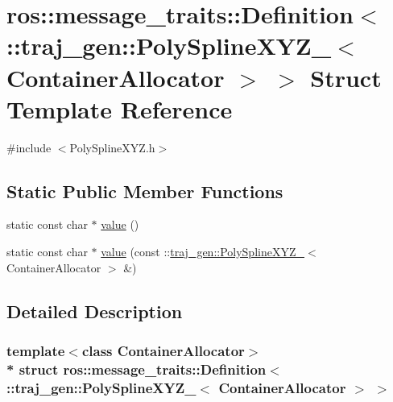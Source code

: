\hypertarget{structros_1_1message__traits_1_1_definition_3_01_1_1traj__gen_1_1_poly_spline_x_y_z___3_01_container_allocator_01_4_01_4}{}\section{ros\+:\+:message\+\_\+traits\+:\+:Definition$<$ \+:\+:traj\+\_\+gen\+:\+:Poly\+Spline\+X\+Y\+Z\+\_\+$<$ Container\+Allocator $>$ $>$ Struct Template Reference}
\label{structros_1_1message__traits_1_1_definition_3_01_1_1traj__gen_1_1_poly_spline_x_y_z___3_01_container_allocator_01_4_01_4}


{\ttfamily \#include $<$Poly\+Spline\+X\+Y\+Z.\+h$>$}

\subsection*{Static Public Member Functions}
\begin{DoxyCompactItemize}
\item 
static const char $\ast$ \hyperlink{structros_1_1message__traits_1_1_definition_3_01_1_1traj__gen_1_1_poly_spline_x_y_z___3_01_container_allocator_01_4_01_4_a7b3cf44a2d6fb186d17c6f754fe9015a}{value} ()
\item 
static const char $\ast$ \hyperlink{structros_1_1message__traits_1_1_definition_3_01_1_1traj__gen_1_1_poly_spline_x_y_z___3_01_container_allocator_01_4_01_4_a87aa9969b0ea4241060c614e9b9231a7}{value} (const \+::\hyperlink{structtraj__gen_1_1_poly_spline_x_y_z__}{traj\+\_\+gen\+::\+Poly\+Spline\+X\+Y\+Z\+\_\+}$<$ Container\+Allocator $>$ \&)
\end{DoxyCompactItemize}


\subsection{Detailed Description}
\subsubsection*{template$<$class Container\+Allocator$>$\\*
struct ros\+::message\+\_\+traits\+::\+Definition$<$ \+::traj\+\_\+gen\+::\+Poly\+Spline\+X\+Y\+Z\+\_\+$<$ Container\+Allocator $>$ $>$}



